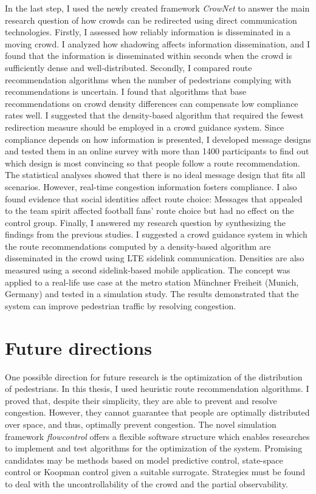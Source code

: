 In the last step, I used the newly created framework \textit{CrowNet} to answer the main research question of how crowds can be redirected using direct communication technologies. Firstly, I assessed how reliably information is disseminated in a moving crowd. I analyzed how shadowing affects information dissemination, and I found that the information is disseminated within seconds when the crowd is sufficiently dense and well-distributed. Secondly, I compared route recommendation algorithms when the number of pedestrians complying with recommendations is uncertain. I found that algorithms that base recommendations on crowd density differences can compensate low compliance rates well. I suggested that the density-based algorithm that required the fewest redirection measure should be employed in a crowd guidance system. Since compliance depends on how information is presented, I developed message designs and tested them in an online survey with more than 1400 participants to find out which design is most convincing so that people follow a route recommendation. The statistical analyses showed that there is no ideal message design that fits all scenarios. However, real-time congestion information fosters compliance. I also found evidence that social identities affect route choice: Messages that appealed to the team spirit affected football fans' route choice but had no effect on the control group. Finally, I answered my research question by synthesizing the findings from the previous studies. I suggested a crowd guidance system in which the route recommendations computed by a density-based algorithm are disseminated in the crowd using LTE sidelink communication. Densities are also measured using a second sidelink-based mobile application. The concept was applied to a real-life use case at the metro station Münchner Freiheit (Munich, Germany) and tested in a simulation study. The results demonstrated that the system can improve pedestrian traffic by resolving congestion.






\section{Future directions}
\label{sec:future}


One possible direction for future research is the optimization of the distribution of pedestrians. In this thesis, I used heuristic route recommendation algorithms. I proved that, despite their simplicity, they are able to prevent and resolve congestion. However, they cannot guarantee that people are optimally distributed over space, and thus, optimally prevent congestion.
The novel simulation framework \textit{flowcontrol} offers a flexible software structure which enables researches to implement and test algorithms for the optimization of the system. Promising candidates may be methods based on model predictive control, state-space control or Koopman control given a suitable surrogate. Strategies must be found to deal with the uncontrollability of the crowd and the partial observability.

